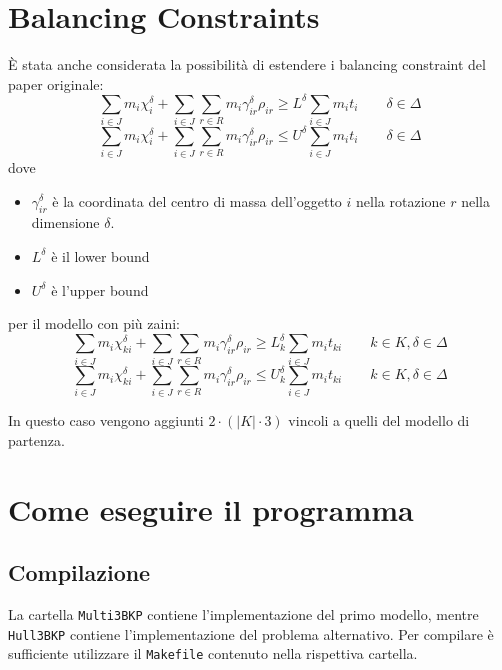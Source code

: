 \documentclass{scrartcl}
\begin{document}
\section{Balancing Constraints}
\label{sec:Balancing:Constraint}
È stata anche considerata la possibilità di estendere i balancing constraint del paper originale:
\begin{equation}
\sum_{i \in J} m_i \chi_{i}^\delta + \sum_{i \in J}\sum_{r \in R} m_i \gamma_{ir}^\delta \rho_{ir} \geq L^\delta \sum_{i \in J} m_i t_i \quad\quad \delta \in \Delta
\end{equation}
\begin{equation}
\sum_{i \in J} m_i \chi_{i}^\delta + \sum_{i \in J}\sum_{r \in R} m_i \gamma_{ir}^\delta \rho_{ir} \leq U^\delta \sum_{i \in J} m_i t_i \quad\quad \delta \in \Delta
\end{equation}
dove 
\begin{itemize}
	\item $\gamma_{ir}^\delta$ è la coordinata del centro di massa dell'oggetto $i$ nella rotazione $r$ nella dimensione $\delta$.
	\item $L^\delta$ è il lower bound 
	\item $U^\delta$ è l'upper bound
\end{itemize}

per il modello con più zaini:
\begin{equation}
\sum_{i \in J} m_i \chi_{ki}^\delta + \sum_{i \in J}\sum_{r \in R} m_i \gamma_{ir}^\delta \rho_{ir} \geq L_k^\delta \sum_{i \in J} m_i t_{ki} \quad\quad k \in K, \delta \in \Delta
\end{equation}
\begin{equation}
\sum_{i \in J} m_i \chi_{ki}^\delta + \sum_{i \in J}\sum_{r \in R} m_i \gamma_{ir}^\delta \rho_{ir} \leq U_k^\delta \sum_{i \in J} m_i t_{ki} \quad\quad k \in K, \delta \in \Delta
\end{equation}

In questo caso vengono aggiunti $2 \cdot (|K| \cdot 3)$ vincoli a quelli del modello di partenza.




\section{Come eseguire il programma}
\subsection{Compilazione}
La cartella \verb|Multi3BKP| contiene l'implementazione del primo modello, mentre \verb|Hull3BKP| contiene l'implementazione del problema alternativo.
Per compilare è sufficiente utilizzare il \verb|Makefile| contenuto nella rispettiva cartella.
\end{document}
